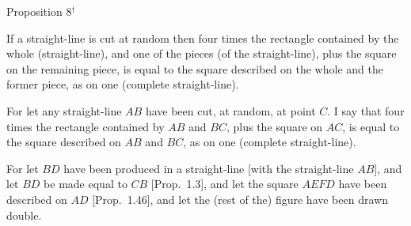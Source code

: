 
\begin{center}
{\large Proposition 8$^\dag$}
\end{center}

If a straight-line is cut at random then four times the rectangle contained
by the whole (straight-line), and one of the pieces (of the straight-line), plus the square on the remaining piece,
is equal to the square described on the whole and the former piece, as
on one (complete straight-line).

For let any straight-line $AB$ have been cut, at random, at point $C$. I say that
four times the rectangle contained by $AB$ and $BC$, plus the square on $AC$,
is equal to the square described on $AB$ and $BC$,  as on one (complete straight-line).

For let $BD$ have been produced in a straight-line [with the straight-line $AB$],
and let $BD$ be made equal to $CB$ [Prop.~1.3], and let the square $AEFD$
have been described on $AD$ [Prop.~1.46], and let the (rest of the) figure
have been drawn double.

\epsfysize=2.5in
\centerline{}

